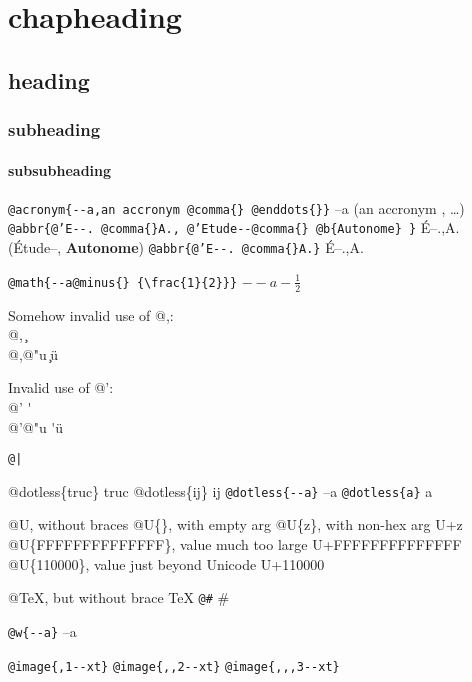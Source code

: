 \documentclass{book}
\newcommand{\GNUTexinfoplaceholder}[1]{}
\newcommand{\GNUTexinfonopagebreakheading}[2]{{\let\clearpage\relax \let\cleardoublepage\relax \let\thispagestyle\GNUTexinfoplaceholder #1{#2}}}
\begin{document}
\GNUTexinfonopagebreakheading{\chapter*}{{chapheading}}

\GNUTexinfonopagebreakheading{\section*}{{heading}}

\GNUTexinfonopagebreakheading{\subsection*}{{subheading}}

\GNUTexinfonopagebreakheading{\subsubsection*}{{subsubheading}}


\texttt{@acronym\{{-}{-}a,an accronym @comma\{\}\ @enddots\{\}\}} --a (an accronym , \dots{})
\texttt{@abbr\{@'E{-}{-}.\ @comma\{\}A.,\ @'Etude{-}{-}@comma\{\}\ @b\{Autonome\}\ \}} \'{E}--.\@ ,A.\@ (\'{E}tude--, \textbf{Autonome})
\texttt{@abbr\{@'E{-}{-}.\ @comma\{\}A.\}} \'{E}--.\@ ,A.\@

\texttt{@math\{{-}{-}a@minus\{\}\ \{\textbackslash{}frac\{1\}\{2\}\}\}} $--a- {\frac{1}{2}}$




Somehow invalid use of @,:\leavevmode{}\\
@, \c{}\leavevmode{}\\
@,@"u \c{}\"{u}

Invalid use of @':\leavevmode{}\\
@' \'{}\leavevmode{}\\
@'@"u \'{}\"{u}

\texttt{@|} 

@dotless\{truc\} truc
@dotless\{ij\} ij
\texttt{@dotless\{{-}{-}a\}} --a
\texttt{@dotless\{a\}} a

@U, without braces @U\{\}, with empty arg 
@U\{z\}, with non-hex arg U+z
@U\{FFFFFFFFFFFFFF\}, value much too large U+FFFFFFFFFFFFFF
@U\{110000\}, value just beyond Unicode U+110000

@TeX, but without brace \TeX{}
\texttt{@\#} \#

\texttt{@w\{{-}{-}a\}} \hbox{--a}

\texttt{@image\{,1{-}{-}xt\}} 
\texttt{@image\{{,}{,}2{-}{-}xt\}} 
\texttt{@image\{{,}{,},3{-}{-}xt\}} 
\end{document}
